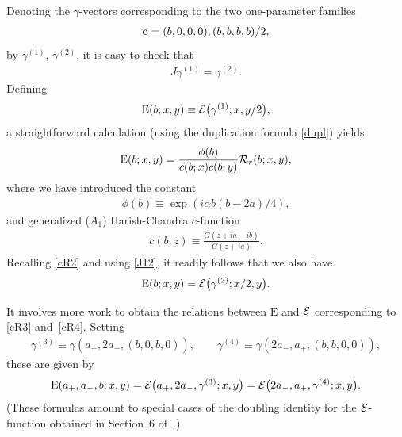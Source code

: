 \documentclass[11pt]{article}
\numberwithin{equation}{section}
\newcommand{\cE}{{\cal E}}
\newcommand{\cR}{{\cal R}}
\newcommand{\rE}{{\mathrm E}}
\newcommand{\aaa}{a_{+},a_{-}}
\begin{document}
Denoting the $\gamma$-vectors corresponding to the two one-parameter families
\begin{gather}
{\bf c}=(b,0,0,0), (b,b,b,b)/2,
\end{gather}
by $\gamma^{(1)}$,  $\gamma^{(2)}$, it is easy to check that
\begin{gather}\label{J12}
J\gamma^{(1)}=\gamma^{(2)}.
\end{gather}
Def\/ining
\begin{gather}\label{EcE}
\rE(b;x,y)\equiv \cE\big(\gamma^{(1)};x,y/2\big),
\end{gather}
a straightforward calculation (using the duplication formula \eqref{dupl}) yields
\begin{gather}\label{ER}
\rE(b;x,y)=\frac{\phi(b)}{c(b;x)c(b;y)}\cR_r(b;x,y),
\end{gather}
where we have introduced the constant
\begin{gather}\label{phib}
\phi(b)\equiv \exp(i\alpha b(b-2a)/4),
\end{gather}
and generalized ($A_1$) Harish-Chandra $c$-function
\begin{gather}\label{cb}
c(b;z)\equiv \frac{G(z+ia-ib)}{G(z+ia)}.
\end{gather}
Recalling \eqref{cR2} and using \eqref{J12}, it readily follows that we also have
\begin{gather}
\rE(b;x,y)=\cE\big(\gamma^{(2)};x/2,y\big).
\end{gather}

It involves more work to obtain the relations between $\rE$ and $\cE$ corresponding to \eqref{cR3} and~\eqref{cR4}. Setting
\begin{gather}
\gamma^{(3)}\equiv \gamma(a_{+},2a_{-},(b,0,b,0)),\qquad \gamma^{(4)}\equiv \gamma(2a_{-},a_{+},(b,b,0,0)),
\end{gather}
these are given by
\begin{gather}
\rE(\aaa,b;x,y)=\cE\big(a_{+},2a_{-},\gamma^{(3)};x,y\big)=\cE\big(2a_{-},a_{+},\gamma^{(4)};x,y\big).
\end{gather}
(These formulas amount to special cases of the doubling identity for the $\cE$-function obtained in Section~6 of~\cite{quad}.)
\end{document}
